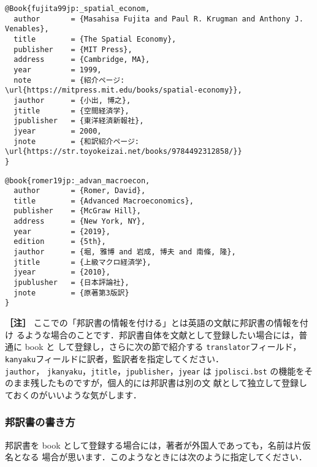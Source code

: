 \documentclass[article]{jlreq}
\newcommand{\midashii}[1]{\noindent \textbf{［#1］}}
\begin{document}
\begin{screen}
\begin{verbatim}
@Book{fujita99jp:_spatial_econom,
  author       = {Masahisa Fujita and Paul R. Krugman and Anthony J. Venables},
  title        = {The Spatial Economy},
  publisher    = {MIT Press},
  address      = {Cambridge, MA},
  year         = 1999,
  note         = {紹介ページ: \url{https://mitpress.mit.edu/books/spatial-economy}},
  jauthor      = {小出, 博之},
  jtitle       = {空間経済学},
  jpublisher   = {東洋経済新報社},
  jyear        = 2000,
  jnote        = {和訳紹介ページ: \url{https://str.toyokeizai.net/books/9784492312858/}}
}
\end{verbatim}
\end{screen}
\vspace*{1em}
\begin{screen}
\begin{verbatim}
@book{romer19jp:_advan_macroecon,
  author       = {Romer, David},
  title        = {Advanced Macroeconomics},
  publisher    = {McGraw Hill},
  address      = {New York, NY},
  year         = {2019},
  edition      = {5th},
  jauthor      = {堀, 雅博 and 岩成, 博夫 and 南條, 隆},
  jtitle       = {上級マクロ経済学},
  jyear        = {2010},
  jpublusher   = {日本評論社},
  jnote        = {原著第3版訳}
}
\end{verbatim}
\end{screen}
\vspace*{1em}

\midashii{注} ここでの「邦訳書の情報を付ける」とは英語の文献に邦訳書の情報を付け
るような場合のことです．邦訳書自体を文献として登録したい場合には，普通に book と
して登録し，さらに次の節で紹介する \texttt{translator}フィールド，
\texttt{kanyaku}フィールドに訳者，監訳者を指定してください．\\ \texttt{jauthor}，
\texttt{jkanyaku}，\texttt{jtitle}，\texttt{jpublisher}，\texttt{jyear} は
\texttt{jpolisci.bst} の機能をそのまま残したものですが，個人的には邦訳書は別の文
献として独立して登録しておくのがいいような気がします．

\subsubsection{邦訳書の書き方}
\label{sec:hoyakusho}

邦訳書を book として登録する場合には，著者が外国人であっても，名前は片仮名となる
場合が思います．このようなときには次のように指定してください．\\
\end{document}
